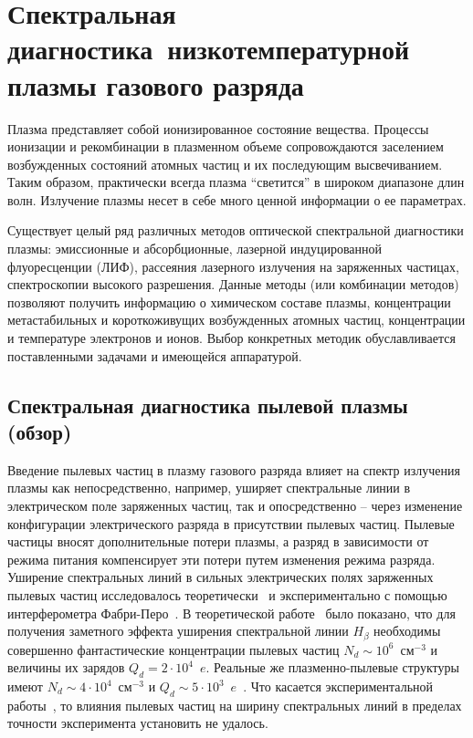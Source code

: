 \chapter{Спектральная диагностика~низкотемпературной плазмы газового разряда}
\label{cha:ch_1}

Плазма представляет собой ионизированное состояние вещества. Процессы
ионизации и рекомбинации в плазменном объеме сопровождаются заселением
возбужденных состояний атомных частиц и их последующим высвечиванием.
Таким образом, практически всегда плазма “светится” в широком диапазоне длин
волн. Излучение плазмы несет в себе много ценной информации о ее параметрах.

Существует целый ряд различных методов оптической спектральной
диагностики плазмы: эмиссионные и абсорбционные, лазерной индуцированной
флуоресценции (ЛИФ), рассеяния лазерного излучения на заряженных частицах,
спектроскопии высокого разрешения. Данные методы (или комбинации методов)
позволяют получить информацию о химическом составе плазмы, концентрации
метастабильных и короткоживущих возбужденных атомных частиц, концентрации
и температуре электронов и ионов. Выбор конкретных методик обуславливается
поставленными задачами и имеющейся аппаратурой.

\section{Спектральная диагностика пылевой плазмы (обзор)}
Введение пылевых частиц в плазму газового разряда влияет на спектр излучения плазмы как
непосредственно, например, уширяет спектральные линии в электрическом поле заряженных частиц,
так и опосредственно – через изменение конфигурации электрического разряда в присутствии пылевых частиц.
Пылевые частицы вносят дополнительные потери плазмы, а разряд в зависимости от режима питания компенсирует
эти потери путем изменения режима разряда. Уширение спектральных линий в сильных
электрических полях заряженных пылевых частиц исследовалось теоретически~\cite{TRINITI} и экспериментально
с помощью интерферометра Фабри-Перо~\cite{Pikalev2014}.
В теоретической работе~\cite{TRINITI} было показано, что для получения заметного эффекта уширения спектральной линии
$H_{\beta}$ необходимы совершенно фантастические концентрации пылевых частиц $N_d \sim 10^6$~см$^{-3}$ и величины
их зарядов $Q_d = 2 \cdot 10^4$~$e$.
Реальные же плазменно-пылевые структуры имеют $N_d \sim 4 \cdot 10^4$~см$^{-3}$ и $Q_d \sim 5 \cdot 10^3$~$e$~\cite{Zobnin2018}.
Что касается экспериментальной работы~\cite{Pikalev2014}, то влияния пылевых частиц на ширину спектральных линий
в пределах точности эксперимента установить не удалось.

